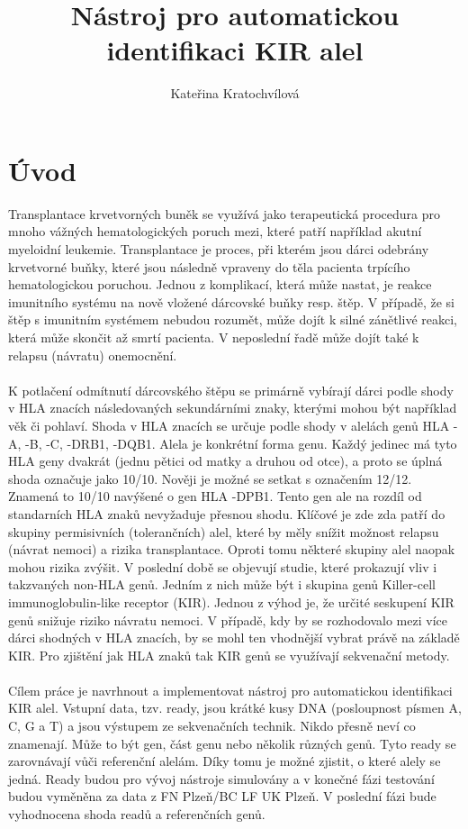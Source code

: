 \documentclass[czech,DP]{thesiskiv}
\author{Kateřina Kratochvílová}
\title{Nástroj pro automatickou identifikaci KIR alel}
\numberwithin{equation}{section}
\begin{document}
%
\maketitle
\tableofcontents

\chapter{Úvod}
Transplantace krvetvorných buněk se využívá jako terapeutická procedura pro mnoho vážných hematologických poruch mezi, které patří například akutní myeloidní leukemie. Transplantace je proces, při kterém jsou dárci odebrány krvetvorné buňky, které jsou následně vpraveny do těla pacienta trpícího hematologickou poruchou. Jednou z komplikací, která může nastat, je reakce imunitního systému na nově vložené dárcovské buňky resp. štěp. V případě, že si štěp s imunitním systémem nebudou rozumět, může dojít k silné zánětlivé reakci, která může skončit až smrtí pacienta. V neposlední řadě může dojít také k relapsu (návratu) onemocnění. 
\\
\\
K potlačení odmítnutí dárcovského štěpu se primárně vybírají dárci podle shody v HLA znacích následovaných sekundárními znaky, kterými mohou být například věk či pohlaví. Shoda v HLA znacích se určuje podle shody v alelách genů HLA -A, -B, -C, -DRB1, -DQB1. Alela je konkrétní forma genu. Každý jedinec má tyto HLA geny dvakrát (jednu pětici od matky a druhou od otce), a proto se úplná shoda označuje jako 10/10. Nověji je možné se setkat s označením 12/12. Znamená to 10/10 navýšené o gen HLA -DPB1. Tento gen ale na rozdíl od standarních HLA znaků nevyžaduje přesnou shodu. Klíčové je zde zda patří do skupiny permisivních (tolerančních) alel, které by měly snížit možnost relapsu (návrat nemoci) a rizika transplantace. Oproti tomu některé skupiny alel naopak mohou rizika zvýšit. V poslední době se objevují studie, které prokazují vliv i takzvaných non-HLA genů. Jedním z nich může být i skupina genů Killer-cell immunoglobulin-like receptor (KIR). Jednou z výhod je, že určité seskupení KIR genů snižuje riziko návratu nemoci. V případě, kdy by se rozhodovalo mezi více dárci shodných v HLA znacích, by se mohl ten vhodnější vybrat právě na základě KIR. Pro zjištění jak HLA znaků tak KIR genů se využívají sekvenační metody. \cite{KIR_transplantace_jindra} \cite{Frycova_bakalarka} \cite{DPB1_houdova}
\\
\\
Cílem práce je navrhnout a implementovat nástroj pro automatickou identifikaci KIR alel. Vstupní data, tzv. ready, jsou krátké kusy DNA (posloupnost písmen A, C, G a T) a jsou výstupem ze sekvenačních technik. Nikdo přesně neví co znamenají. Může to být gen, část genu nebo několik různých genů. Tyto ready se zarovnávají vůči referenční alelám. Díky tomu je možné zjistit, o které alely se jedná. Ready budou pro vývoj nástroje simulovány a v konečné fázi testování budou vyměněna za data z FN Plzeň/BC LF UK Plzeň. V poslední fázi bude vyhodnocena shoda readů a referenčních genů.
\end{document}
